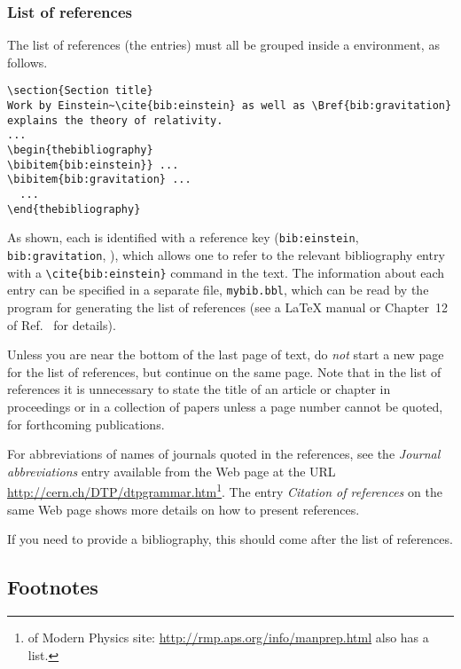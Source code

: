 \documentclass{cernrep}
\begin{document}
\subsubsection{List of references}

The list of references (the  entries) must all be grouped
inside a  environment, as follows.

\begin{verbatim}
\section{Section title}
Work by Einstein~\cite{bib:einstein} as well as \Bref{bib:gravitation}
explains the theory of relativity.
...
\begin{thebibliography}
\bibitem{bib:einstein}} ...
\bibitem{bib:gravitation} ...
  ...
\end{thebibliography}
\end{verbatim}
As shown, each  is identified with a reference key
(\texttt{bib:einstein}, \texttt{bib:gravitation}, \etc), which allows
one to refer to the relevant bibliography entry with a
\verb|\cite{bib:einstein}| command in the text. The information about
each entry can be specified in a separate file, \eg
\texttt{mybib.bbl}, which can be read by the \BibTeX{} program for
generating the list of references (see a \LaTeX{} manual or Chapter~12
of Ref.~\cite{bib:mittelbach2004} for details).

Unless you are near the bottom of the last page of text, do \emph{not}
start a new page for the list of references, but continue on the same
page. Note that in the list of references it is unnecessary to state
the title of an article or chapter in proceedings or in a collection
of papers unless a page number cannot be quoted, \eg for forthcoming
publications.

For abbreviations of names of journals quoted in the references, see
the \emph{Journal abbreviations} entry available from the Web page at
the URL \url{http://cern.ch/DTP/dtpgrammar.htm}\footnote{%
of Modern Physics site: \url{http://rmp.aps.org/info/manprep.html}
also has a list.}. The entry \emph{Citation of references} on the same
Web page shows more details on how to present references.

If you need to provide a bibliography, this should come after the list
of references.

\subsection{Footnotes}
\end{document}
